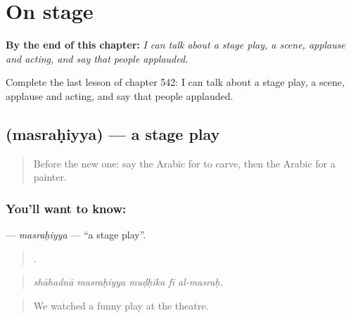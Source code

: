
\chapter{On stage}
\label{ch:ar-on-stage}

\begin{chapteropening}
\textbf{By the end of this chapter:} \emph{I can talk about a stage play, a scene, applause and acting, and say that people applauded.}

Complete the last lesson of chapter 542: I can talk about a stage play, a scene, applause and acting, and say that people applauded.
\end{chapteropening}

\section[\texorpdfstring{\ar{مسرحية} (masraḥiyya)}{مسرحية (masraḥiyya)}]{ (masraḥiyya) — a stage play}

\label{lesson:AR-C542-masrahiyya}



\begin{quote}
Before the new one: say the Arabic for to carve, then the Arabic for a painter.
\end{quote}

\subsection*{You'll want to know: }
\textbf{} — \emph{masraḥiyya} — \textquotedblleft{}a stage play\textquotedblright{}.

\begin{quote}
    .
\end{quote}

\begin{quote}
\emph{shāhadnā masraḥiyya muḍḥika fī al-masraḥ.}
\end{quote}

\begin{quote}
We watched a funny play at the theatre.
\end{quote}

